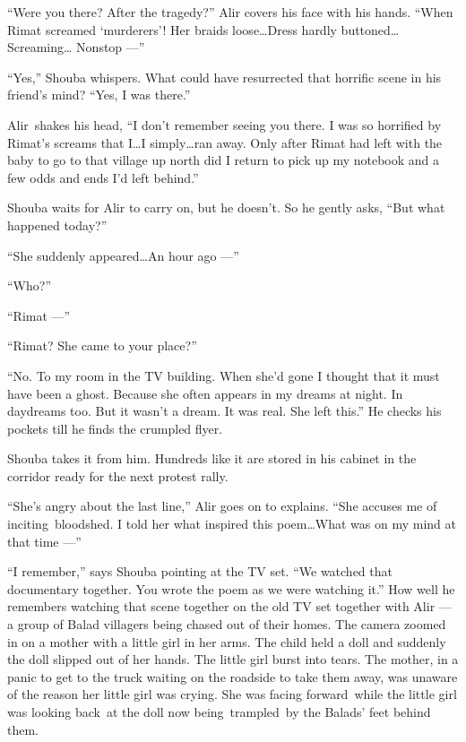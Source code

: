 \documentclass[twoside,11pt,openany]{book}
\begin{document}
``Were you there? After the tragedy?'' Alir covers his face with his hands.
``When Rimat screamed `murderers'! Her braids loose{\ldots}Dress hardly buttoned{\ldots}Screaming{\ldots}
Nonstop ---''

``Yes,'' Shouba whispers. What could have resurrected that horrific scene in his friend's
mind?  {}``Yes, I was there.''

Alir~shakes his head, ``I don't remember seeing you there.{ }I was so horrified by Rimat's
screams that I{\ldots}I simply{\ldots}ran away. Only after Rimat had left with the baby to go to that village up north
did I return to pick up my notebook and a few odds and ends I'd left behind.''

Shouba waits for Alir to carry on, but he doesn't. So he gently asks, ``But what happened
today?''

``She suddenly appeared{\ldots}An hour ago ---''

``Who?''

``Rimat ---''

``Rimat? She came to your place?''

``No. To my room in the TV building. When she'd gone I thought that it must have been a ghost. Because she
often appears in my dreams at night. In daydreams too. But it wasn't a dream. It was real. She left
this.'' He checks his pockets till he finds the crumpled flyer.

Shouba takes it from him. Hundreds like it are stored in his cabinet in the corridor ready for the next protest rally.

``She's angry about the last line,'' Alir goes on to explains. ``She accuses me
of inciting~bloodshed. I told her what inspired this poem{\ldots}What was on my mind at that time ---''

``I remember,'' says Shouba pointing at the TV set. ``We watched that documentary
together. You wrote the poem as we were watching it.'' How well he remembers watching that scene together
on the old TV set together with Alir ---  a group of Balad villagers being chased out of their homes. The camera
zoomed in on a mother with a little girl in her arms. The child held a doll and suddenly the doll slipped out of her
hands. The little girl burst into tears. The mother, in a panic to get to the truck waiting on the roadside to take
them away, was unaware of the reason her little girl was crying. She was facing forward~while the little girl was
looking back~at the doll now being~trampled~by the Balads{'} feet behind them.
\end{document}
